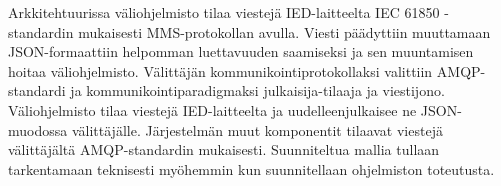 Arkkitehtuurissa väliohjelmisto tilaa viestejä IED-laitteelta IEC 61850 -standardin mukaisesti MMS-protokollan avulla. Viesti päädyttiin muuttamaan JSON-formaattiin helpomman luettavuuden saamiseksi ja sen muuntamisen hoitaa väliohjelmisto. Välittäjän kommunikointiprotokollaksi valittiin AMQP-standardi ja kommunikointiparadigmaksi jul\-kai\-si\-ja-ti\-laa\-ja ja viestijono. Väliohjelmisto tilaa viestejä IED-laitteelta ja uudelleenjulkaisee ne JSON-muodossa välittäjälle. Järjestelmän muut komponentit tilaavat viestejä välittäjältä AMQP-standardin mukaisesti. Suunniteltua mallia tullaan tarkentamaan teknisesti myöhemmin kun suunnitellaan ohjelmiston toteutusta.
